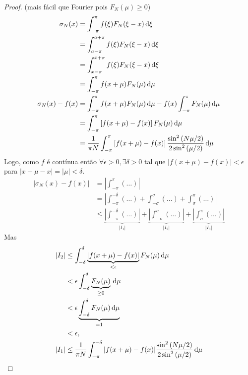 \begin{proof}
    (mais f\'{a}cil que Fourier pois $F_N(\mu) \geq 0$)
    \begin{align*}
        \sigma_N(x) &= \int_{-\pi}^\pi f(\xi) F_N(\xi - x) \, \mathrm{d}\xi \\
        &= \int_{a - \pi}^{a + \pi} f(\xi) F_{N}(\xi - x) \, \mathrm{d}\xi \\
        &= \int_{x - \pi}^{x + \pi} f(\xi) F_N(\xi - x) \, \mathrm{d}\xi \\
        &= \int_{-\pi}^\pi f(x + \mu) F_N(\mu) \, \mathrm{d}\mu \\
        \sigma_N(x) - f(x) &= \int_{-\pi}^\pi f(x + \mu) F_N(\mu) \, \mathrm{d}\mu - f(x) \int_{-\pi}^\pi F_N(\mu) \, \mathrm{d}\mu \\
        &= \int_{-\pi}^\pi \left[ f(x + \mu) - f(x) \right] F_N(\mu) \, \mathrm{d}\mu \\
        &= \frac{1}{\pi N} \int_{-\pi}^\pi \left[ f(x + \mu) - f(x) \right] \frac{\sin^2\left( N \mu/2 \right)}{2 \sin^2\left( \mu/2 \right)} \, \mathrm{d}\mu
    \end{align*}
    Logo, como $f$ \'{e} cont\'{i}nua ent\~{a}o $\forall \epsilon > 0, \exists \delta > 0$ tal que $| f(x + \mu) - f(x)| < \epsilon$ para $| x + \mu - x| = | \mu | < \delta$.
    \begin{align*}
        | \sigma_N(x) - f(x)| &= \left| \int_{-\pi}^\pi \left( \ldots \right) \right| \\
        &= \left| \int_{-\pi}^{-\delta} \left( \ldots \right) + \int_{-\sigma}^\sigma \left( \ldots \right) + \int_\sigma^\pi \left( \ldots \right) \right| \\
        &\leq \underbrace{\left| \int_{-\pi}^{-\delta} \left( \ldots \right) \right|}_{|I_1|} + \underbrace{\left| \int_{-\sigma}^\sigma \left( \ldots \right) \right|}_{|I_2|} + \underbrace{\left| \int_\sigma^\pi \left( \ldots \right) \right|}_{|I_3|}
    \end{align*}
    Mas
    \begin{align*}
        |I_2| &\leq \int_{-\delta}^\delta \underbrace{| f(x + \mu) - f(x) |}_{< \epsilon} F_N(\mu) \id{\mu} \\
        &< \epsilon \int_{-\delta}^\delta \underbrace{F_N(\mu)}_{\geq 0} \id{\mu} \\
        &< \epsilon \underbrace{\int_{-\delta}^\delta F_N(\mu) \id{\mu}}_{=1} \\
        &< \epsilon, \\
        |I_1| &\leq  \frac{1}{\pi N} \int_{-\pi}^{-\delta} | f(x + \mu) - f(x) | \frac{\sin^2\left( N \mu/2 \right)}{2 \sin^2\left( \mu/2 \right)} \id{\mu} \\

\end{align*}
\end{proof}
